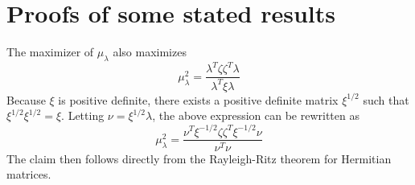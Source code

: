 \documentclass[10pt,journal,compsoc]{IEEEtran}
\theoremstyle{definition}
\begin{document}
\section{Proofs of some stated results}
\label{sec:proofs-some-stated}
\begin{IEEEproof}
  The maximizer of $\mu_\lambda$ also maximizes
  \begin{equation*}
    \mu_{\lambda}^{2} = \frac{\lambda^{T} \zeta \zeta^{T}
      \lambda}{\lambda^{T} \xi \lambda}
  \end{equation*}
  Because $\xi$ is positive definite, there exists a positive definite matrix
  $\xi^{1/2}$ such that $\xi^{1/2} \xi^{1/2} = \xi$. Letting $\nu = \xi^{1/2}
  \lambda$, the above expression can be rewritten as
  \begin{equation*}
    \mu_{\lambda}^{2} = \frac{\nu^{T} \xi^{-1/2} \zeta \zeta^{T}
      \xi^{-1/2} \nu}{ \nu^{T} \nu}
  \end{equation*}
  The claim then follows directly from the Rayleigh-Ritz theorem for
  Hermitian matrices.
\end{IEEEproof}
\end{document}
